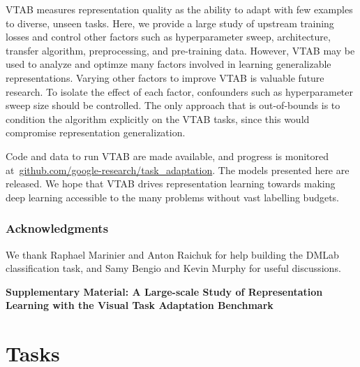 \documentclass{article}
\begin{document}
VTAB measures representation quality as the ability to adapt with few examples to diverse, unseen tasks.
Here, we provide a large study of upstream training losses and control other factors such as
hyperparameter sweep, architecture, transfer algorithm,
preprocessing, and pre-training data.
However, VTAB may be used to analyze and optimze many factors involved in learning generalizable representations.
Varying other factors to improve VTAB is valuable future research.
To isolate the effect of each factor, confounders such as hyperparameter sweep size should be controlled.
The only approach that is out-of-bounds is to condition the algorithm explicitly on the VTAB tasks, since this would compromise representation generalization.

Code and data to run VTAB are made available, and progress is monitored at~\url{github.com/google-research/task_adaptation}.
The models presented here are released.
We hope that VTAB drives representation learning towards making deep learning accessible to the many problems without vast labelling budgets.

 \subsubsection*{Acknowledgments}
We thank Raphael Marinier and Anton Raichuk for help building the DMLab classification task,
and Samy Bengio and Kevin Murphy for useful discussions.




\appendix
\clearpage
\onecolumn

\begin{center}
{\Large\bf Supplementary Material: A Large-scale Study of Representation Learning with the Visual Task Adaptation Benchmark}
\end{center}

\section{Tasks \label{app:tasks}}
\end{document}
